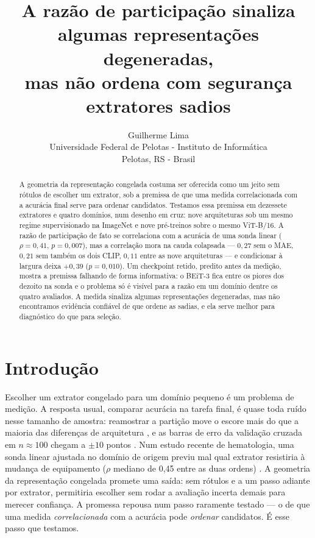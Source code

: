 \documentclass{esannV2}
\begin{document}
\title{A razão de participação sinaliza algumas representações degeneradas,\\mas não ordena com segurança extratores sadios}

\author{Guilherme Lima
\vspace{.3cm}\\
Universidade Federal de Pelotas - Instituto de Informática \\
Pelotas, RS - Brasil
}

\maketitle

\begin{abstract}
A geometria da representação congelada costuma ser oferecida como um jeito sem
rótulos de escolher um extrator, sob a premissa de que uma medida
correlacionada com a acurácia final serve para ordenar candidatos. Testamos
essa premissa em dezessete extratores e quatro domínios, num desenho em cruz:
nove arquiteturas sob um mesmo regime supervisionado na ImageNet e nove
pré-treinos sobre o mesmo ViT-B/16. A razão de participação de fato se
correlaciona com a acurácia de uma sonda linear ($\rho = 0{,}41$,
$p = 0{,}007$), mas a correlação mora na cauda colapsada --- $0{,}27$ sem o
MAE, $0{,}21$ sem também os dois CLIP, $0{,}11$ entre as nove arquiteturas ---
e condicionar à largura deixa $+0{,}39$ ($p = 0{,}010$). Um checkpoint retido,
predito antes da medição, mostra a premissa falhando de forma informativa: o
BEiT-3 fica entre os piores dos dezoito na sonda e o problema só é visível para
a razão em um domínio dentre os quatro avaliados. A medida sinaliza algumas
representações degeneradas, mas não encontramos evidência confiável de que
ordene as sadias, e ela serve melhor para diagnóstico do que para seleção.
\end{abstract}

\section{Introdução}

Escolher um extrator congelado para um domínio pequeno é um problema de
medição. A resposta usual, comparar acurácia na tarefa final, é quase toda
ruído nesse tamanho de amostra: reamostrar a partição move o escore mais do que
a maioria das diferenças de arquitetura \cite{Bouthillier}, e as barras de erro
da validação cruzada em $n \approx 100$ chegam a $\pm 10$ pontos
\cite{Varoquaux}. Num estudo recente de hematologia, uma sonda linear
ajustada no domínio de origem previu mal qual extrator resistiria à mudança de
equipamento ($\rho$ mediano de 0,45 entre as duas ordens) \cite{Hemato}. A geometria da representação congelada promete uma saída: sem
rótulos e a um passo adiante por extrator, permitiria escolher sem rodar a
avaliação incerta demais para merecer confiança. A promessa repousa num passo
raramente testado --- o de que uma medida \emph{correlacionada} com a acurácia
pode \emph{ordenar} candidatos. É esse passo que testamos.
\end{document}
